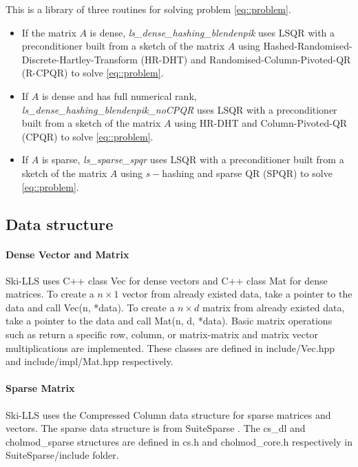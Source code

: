 \documentclass[english,11pt]{article}
\begin{document}
This is a library of three routines for solving problem \eqref{eq::problem}. 

\begin{itemize}
	\item If the matrix $A$ is dense, {\it ls_dense_hashing_blendenpik} uses LSQR with a preconditioner built from a sketch of the matrix $A$ using Hashed-Randomised-Discrete-Hartley-Transform (HR-DHT) and Randomised-Column-Pivoted-QR (R-CPQR) to solve \eqref{eq::problem}.

	\item If $A$ is dense and has full numerical rank, {\it ls_dense_hashing_blendenpik_noCPQR} uses LSQR with a preconditioner built from a sketch of the matrix $A$ using HR-DHT and Column-Pivoted-QR (CPQR) to solve \eqref{eq::problem}.

	\item   If $A$ is sparse, {\it ls_sparse_spqr} uses LSQR with a preconditioner built from a sketch of the matrix $A$ using $s-$hashing and sparse QR (SPQR) to solve \eqref{eq::problem}.
\end{itemize}

\subsection{Data structure}

\paragraph{Dense Vector and Matrix}
Ski-LLS uses C++ class Vec for dense vectors and C++ class Mat for dense matrices. 
To create a $n\times 1$ vector from already existed data, take a pointer to the data and call Vec(n, *data). 
To create a $n \times d$ matrix from already existed data, take a pointer to the data and call Mat(n, d, *data). Basic matrix operations such as return a specific row, column, or matrix-matrix and matrix vector multiplications are implemented.  
These classes are defined in include/Vec.hpp and include/impl/Mat.hpp respectively. 


\paragraph{Sparse Matrix}
Ski-LLS uses the Compressed Column data structure for sparse matrices and vectors. The sparse data structure is from SuiteSparse \cite{Davis:2011ft}. The cs_dl and cholmod_sparse structures are defined in cs.h and cholmod_core.h respectively in SuiteSparse/include folder. 
\end{document}
